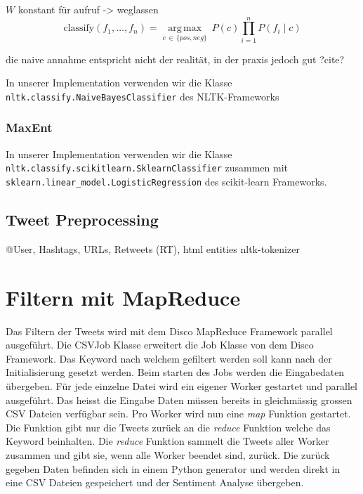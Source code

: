 \documentclass[12pt, oneside]{report}   	%
\begin{document}
$W$ konstant für aufruf -> weglassen
$$ \mathrm{classify}(f_1,\dots,f_n) = \underset{c \, \in \, \{pos,neg\} }{\operatorname{arg\,max}} \ P(c) \displaystyle\prod_{i=1}^n P(f_i\mid c) $$

die naive annahme entspricht nicht der realität, in der praxis jedoch gut ?cite?

In unserer Implementation verwenden wir die Klasse\\
 \verb|nltk.classify.NaiveBayesClassifier| des NLTK-Frameworks
 

\subsubsection{MaxEnt}
In unserer Implementation verwenden wir die Klasse\\
\verb|nltk.classify.scikitlearn.SklearnClassifier| zusammen mit\\
\verb|sklearn.linear_model.LogisticRegression| des scikit-learn Frameworks.

\subsection{Tweet Preprocessing}
@User, Hashtags, URLs, Retweets (RT), html entities
nltk-tokenizer

\section{Filtern mit MapReduce}
Das Filtern der Tweets wird mit dem Disco MapReduce Framework parallel ausgeführt. Die CSVJob Klasse erweitert die Job Klasse von dem Disco Framework. Das Keyword nach welchem gefiltert werden soll kann nach der Initialisierung gesetzt werden. Beim starten des Jobs werden die Eingabedaten übergeben. Für jede einzelne Datei wird ein eigener Worker gestartet und parallel ausgeführt. Das heisst die Eingabe Daten müssen bereits in gleichmässig grossen CSV Dateien verfügbar sein. Pro Worker wird nun eine \emph{map} Funktion gestartet. Die Funktion gibt nur die Tweets zurück an die \emph{reduce} Funktion welche das Keyword beinhalten. Die \emph{reduce} Funktion sammelt die Tweets aller Worker zusammen und gibt sie, wenn alle Worker beendet sind, zurück. Die zurück gegeben Daten befinden sich in einem Python generator und werden direkt in eine CSV Dateien gespeichert und der Sentiment Analyse übergeben.
\end{document}
